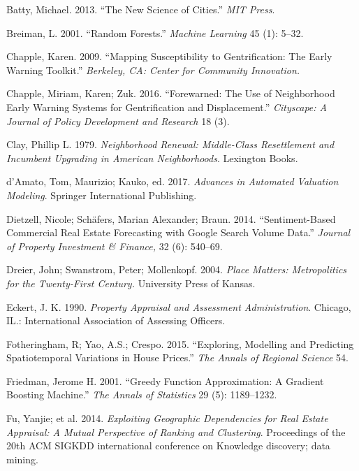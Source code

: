 \documentclass[12pt,]{article}
\begin{document}
\leavevmode\hypertarget{ref-Batty2013}{}%
Batty, Michael. 2013. ``The New Science of Cities.'' \emph{MIT Press}.

\leavevmode\hypertarget{ref-Breiman2001}{}%
Breiman, L. 2001. ``Random Forests.'' \emph{Machine Learning} 45 (1):
5--32.

\leavevmode\hypertarget{ref-Chapple2009}{}%
Chapple, Karen. 2009. ``Mapping Susceptibility to Gentrification: The
Early Warning Toolkit.'' \emph{Berkeley, CA: Center for Community
Innovation.}

\leavevmode\hypertarget{ref-Chapple2016}{}%
Chapple, Miriam, Karen; Zuk. 2016. ``Forewarned: The Use of Neighborhood
Early Warning Systems for Gentrification and Displacement.''
\emph{Cityscape: A Journal of Policy Development and Research} 18 (3).

\leavevmode\hypertarget{ref-Clay1979}{}%
Clay, Phillip L. 1979. \emph{Neighborhood Renewal: Middle-Class
Resettlement and Incumbent Upgrading in American Neighborhoods}.
Lexington Books.

\leavevmode\hypertarget{ref-Springer2017}{}%
d'Amato, Tom, Maurizio; Kauko, ed. 2017. \emph{Advances in Automated
Valuation Modeling}. Springer International Publishing.

\leavevmode\hypertarget{ref-Dietzell2014}{}%
Dietzell, Nicole; Schäfers, Marian Alexander; Braun. 2014.
``Sentiment-Based Commercial Real Estate Forecasting with Google Search
Volume Data.'' \emph{Journal of Property Investment \& Finance,} 32 (6):
540--69.

\leavevmode\hypertarget{ref-Dreier2004}{}%
Dreier, John; Swanstrom, Peter; Mollenkopf. 2004. \emph{Place Matters:
Metropolitics for the Twenty-First Century.} University Press of Kansas.

\leavevmode\hypertarget{ref-Eckert1990}{}%
Eckert, J. K. 1990. \emph{Property Appraisal and Assessment
Administration}. Chicago, IL.: International Association of Assessing
Officers.

\leavevmode\hypertarget{ref-Fotheringham2015}{}%
Fotheringham, R; Yao, A.S.; Crespo. 2015. ``Exploring, Modelling and
Predicting Spatiotemporal Variations in House Prices.'' \emph{The Annals
of Regional Science} 54.

\leavevmode\hypertarget{ref-Friedman2001}{}%
Friedman, Jerome H. 2001. ``Greedy Function Approximation: A Gradient
Boosting Machine.'' \emph{The Annals of Statistics} 29 (5): 1189--1232.

\leavevmode\hypertarget{ref-Fu2014}{}%
Fu, Yanjie; et al. 2014. \emph{Exploiting Geographic Dependencies for
Real Estate Appraisal: A Mutual Perspective of Ranking and Clustering}.
Proceedings of the 20th ACM SIGKDD international conference on Knowledge
discovery; data mining.
\end{document}
